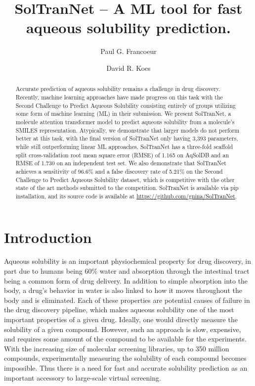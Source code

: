 \documentclass[journal=jmcmar,manuscript=article]{achemso}
\title{SolTranNet -- A ML tool for fast aqueous solubility prediction.}
\author{Paul G. Francoeur}
\author{David R. Koes}
\affiliation[Pitt]{Department of Computational and Systems Biology, University of Pittsburgh, Pittsburgh, PA 15260}
\begin{document}
\begin{abstract}
Accurate prediction of aqueous solubility remains a challenge in drug discovery.
Recently, machine learning approaches have made progress on this task with the Second Challenge to Predict Aqueous Solubility consisting entirely of groups utilizing some form of machine learning (ML) in their submission.
We present SolTranNet, a molecule attention transformer model to predict aqueous solubility from a molecule's SMILES representation.
Atypically, we demonstrate that larger models do not perform better at this task, with the final version of SolTranNet only having 3,393 parameters, while still outperforming linear ML approaches.
SolTranNet has a three-fold scaffold split cross-validation root mean square error (RMSE) of 1.165 on AqSolDB and an RMSE of 1.730 on an independent test set.
We also demonstrate that SolTranNet achieves a sensitivity of 96.6\% and a false discovery rate of 5.21\% on the Second Challenge to Predict Aqueous Solubility dataset, which is competitive with the other state of the art methods submitted to the competition.
SolTranNet is available via pip installation, and its source code is available at \url{https://github.com/gnina/SolTranNet}.

\end{abstract}


\section{Introduction}
Aqueous solubility is an important physiochemical property for drug discovery, in part due to humans being 60\% water\cite{HumanWater} and absorption through the intestinal tract being a common form of drug delivery. 
In addition to simple absorption into the body, a drug's behavior in water is also linked to how it moves throughout the body and is eliminated. Each of these properties are potential causes of failure in the drug discovery pipeline, which makes aqueous solubility one of the most important properties of a given drug.\cite{LIPINSKI1997,DI2006446,EKINS2002305}
Ideally, one would directly measure the solubility of a given compound.
However, such an approach is slow, expensive, and requires some amount of the compound to be available for the experiments.
With the increasing size of molecular screening libraries, up to 350 million compounds,\cite{NatureVS} experimentally measuring the solubility of each compound becomes impossible.
Thus there is a need for fast and accurate solubility prediction as an important accessory to large-scale virtual screening.
\end{document}
